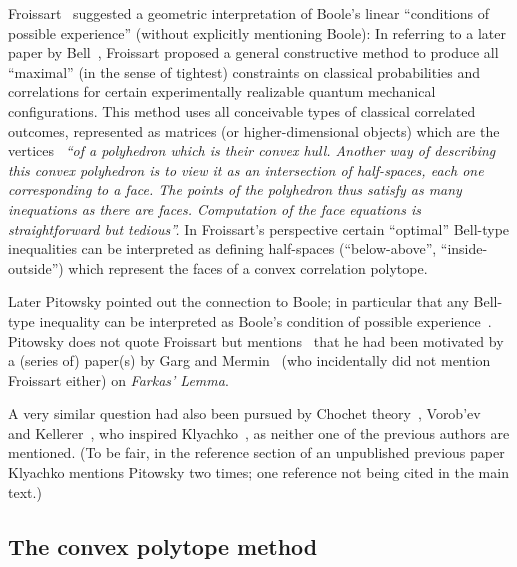 Froissart~\cite{froissart-81,cirelson} suggested a geometric interpretation of Boole's linear ``conditions of possible
experience'' (without explicitly mentioning Boole): In referring to a later paper by Bell~\cite{Bell-71}, Froissart
proposed a general constructive method to produce all ``maximal'' (in the sense of tightest)
constraints on classical probabilities and correlations for certain experimentally realizable quantum mechanical configurations.
This method uses all conceivable types of classical correlated outcomes, represented as matrices (or higher-dimensional objects)
which are the vertices~\cite[p.~243]{froissart-81}  {\em ``of a polyhedron which is their convex hull.
Another way of describing this convex polyhedron is to view it as an intersection
of half-spaces, each one corresponding to a face. The points of the
polyhedron thus satisfy as many inequations as there are faces. Computation
of the face equations is straightforward but tedious''.}
In Froissart's perspective certain ``optimal'' Bell-type inequalities can be interpreted as
defining half-spaces (``below-above'', ``inside-outside'')
which represent the faces of a convex correlation polytope.

Later Pitowsky pointed out the connection to Boole;
in particular that any Bell-type inequality can be interpreted as
Boole's condition of possible experience~\cite{pitowsky-86,pitowsky,pitowsky-89a,Pit-91,Pit-94,2000-poly}.
Pitowsky  does not quote Froissart but mentions~\cite[p.~1556]{pitowsky-86} that he
had been motivated by a (series of) paper(s) by Garg and Mermin~\cite{Garg1984}
(who incidentally did not mention Froissart either)
on  {\em Farkas' Lemma}.

A very similar question had also been pursued by Chochet theory~\cite{Bishop-Leeuw-1959},
Vorob'ev~\cite{Vorobev-1962} and Kellerer~\cite{Kellerer-1964,Kellerer-1984},
who inspired Klyachko~\cite{Klyachko-2008},
as neither one of the previous authors are mentioned.
(To be fair, in the reference section of an unpublished previous paper~\cite{Klyachko-2002} Klyachko
mentions Pitowsky two times; one reference not being cited in the main text.)


\subsection{The convex polytope method}
\label{2017-b-chm}


